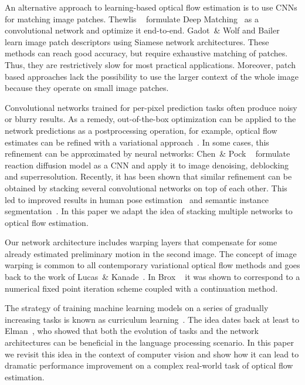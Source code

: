 \documentclass[10pt,twocolumn,letterpaper]{article}%
\begin{document}
An alternative approach to learning-based optical flow estimation is to use CNNs for matching image patches.
Thewlis \etal~\cite{Thewlis2016trainabledm} formulate Deep Matching~\cite{deepflow} as a convolutional network and optimize it end-to-end. Gadot~\& Wolf \cite{Gadot2016patchbatch} and Bailer \etal~\cite{Bailer2016match} learn image patch descriptors using Siamese network architectures.
These methods can reach good accuracy, but require exhaustive matching of patches. 
Thus, they are restrictively slow for most practical applications.
Moreover, patch based approaches lack the possibility to use the larger context of the whole image
because they operate on small image patches.

Convolutional networks trained for per-pixel prediction tasks often produce noisy or blurry results. 
As a remedy, out-of-the-box optimization can be applied to the network predictions as a postprocessing operation, for example, optical flow estimates can be refined with a variational approach~\cite{DFIB15}.
In some cases, this refinement can be approximated by neural networks: Chen~\& Pock ~\cite{Chen2016tnrd} formulate reaction diffusion model as a CNN and apply it to image denoising, deblocking and superresolution.
Recently, it has been shown that similar refinement can be obtained by stacking several convolutional networks on top of each other.
This led to improved results in human pose estimation~\cite{NYD16,Carreira2016pose} and semantic instance segmentation~\cite{Romera2016instance}.
In this paper we adapt the idea of stacking multiple networks to optical flow estimation. 

Our network architecture includes warping layers that compensate for some already estimated preliminary motion in the second image. The concept of image warping is common to all contemporary variational optical flow methods and goes back to the work of Lucas~\& Kanade~\cite{LucasKanade}. In Brox \etal~\cite{Brox2004flow} it was shown to correspond to a numerical fixed point iteration scheme coupled with a continuation method. 

The strategy of training machine learning models on a series of gradually increasing tasks is known as curriculum learning~\cite{Bengio2009curriculum}. The idea dates back at least to Elman~\cite{Elman93startingsmall}, who showed that both the evolution of tasks and the network architectures can be beneficial in the language processing scenario. In this paper we revisit this idea in the context of computer vision and show how it can lead to dramatic performance improvement on a complex real-world task of optical flow estimation.
\end{document}
